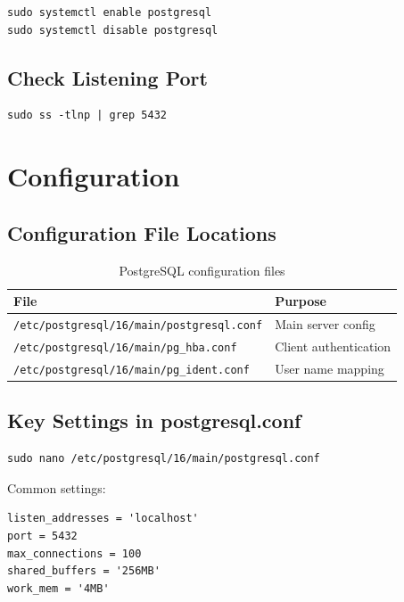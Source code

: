 \documentclass[11pt,a4paper]{article}
\begin{document}
\begin{lstlisting}[style=shell]
sudo systemctl enable postgresql
sudo systemctl disable postgresql
\end{lstlisting}

\subsection{Check Listening Port}

\begin{lstlisting}[style=shell]
sudo ss -tlnp | grep 5432
\end{lstlisting}

\section{Configuration}

\subsection{Configuration File Locations}

\begin{table}[h]
\centering
\begin{tabular}{@{}ll@{}}
\toprule
\textbf{File} & \textbf{Purpose} \\
\midrule
\texttt{/etc/postgresql/16/main/postgresql.conf} & Main server config \\
\texttt{/etc/postgresql/16/main/pg\_hba.conf} & Client authentication \\
\texttt{/etc/postgresql/16/main/pg\_ident.conf} & User name mapping \\
\bottomrule
\end{tabular}
\caption{PostgreSQL configuration files}
\end{table}

\subsection{Key Settings in postgresql.conf}

\begin{lstlisting}[style=shell]
sudo nano /etc/postgresql/16/main/postgresql.conf
\end{lstlisting}

Common settings:
\begin{lstlisting}
listen_addresses = 'localhost'
port = 5432
max_connections = 100
shared_buffers = '256MB'
work_mem = '4MB'
\end{lstlisting}
\end{document}
